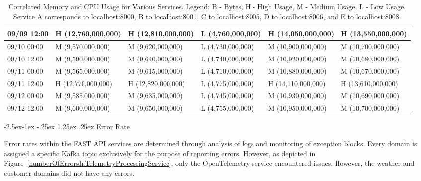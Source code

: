 \documentclass[review]{elsarticle}
\makeatletter
\renewcommand\paragraph{\@startsection{paragraph}{4}{\z@}%
            {-2.5ex\@plus -1ex \@minus -.25ex}%
            {1.25ex \@plus .25ex}%
            {\normalfont\normalsize\itshape}}
\makeatother
\begin{document}
\begin{table}
\begin{tabular}{|l|l|l|l|l|l|}
  09/09 12:00 & H (12,760,000,000) & H (12,810,000,000) & L (4,760,000,000) & H (14,050,000,000) & H (13,550,000,000) \\ \hline

  09/10 00:00 & M (9,570,000,000)  & M (9,620,000,000)  & L (4,730,000,000) & M (10,900,000,000) & M (10,700,000,000) \\ \hline

  09/10 12:00 & M (9,590,000,000)  & M (9,640,000,000)  & L (4,740,000,000) & M (10,920,000,000) & M (10,680,000,000) \\ \hline

  09/11 00:00 & M (9,565,000,000)  & M (9,615,000,000)  & L (4,710,000,000) & M (10,880,000,000) & M (10,670,000,000) \\ \hline

  09/11 12:00 & H (12,770,000,000) & H (12,820,000,000) & L (4,775,000,000) & H (14,110,000,000) & H (13,610,000,000) \\ \hline

  09/12 00:00 & M (9,585,000,000)  & M (9,635,000,000)  & L (4,745,000,000) & M (10,930,000,000) & M (10,690,000,000) \\ \hline

  09/12 12:00 & M (9,600,000,000)  & M (9,650,000,000)  & L (4,755,000,000) & M (10,950,000,000) & M (10,700,000,000) \\ \hline

  \end{tabular}

  \caption{Correlated Memory and CPU Usage for Various Services. Legend: B - Bytes, H - High Usage, M - Medium Usage, L - Low Usage. Service A corresponds to localhost:8000, B to localhost:8001, C to localhost:8005, D to localhost:8006, and E to localhost:8008.}

  \label{table:memory-cpu-correlation}

\end{table}

\paragraph{Error Rate}

Error rates within the FAST API services are determined through analysis of logs and monitoring of exception blocks. Every domain is assigned a specific Kafka topic exclusively for the purpose of reporting errors. However, as depicted in Figure~\ref{numberOfErrorsInTelemetryProcessingService}, only the OpenTelemetry service encountered issues. However, the weather and customer domains did not have any errors.
\end{document}
